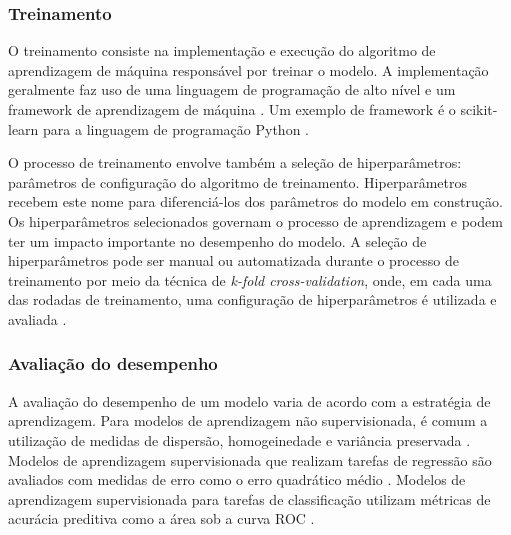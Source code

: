 \subsubsection{Treinamento}

O treinamento consiste na implementação e execução do algoritmo de aprendizagem de máquina responsável por treinar o modelo. A implementação geralmente faz uso de
uma linguagem de programação de alto nível e um framework de aprendizagem de máquina \cite{Greener2021}. Um exemplo de framework é o scikit-learn \cite{ScikitLearn}
para a linguagem de programação Python \cite{Python}.

O processo de treinamento envolve também a seleção de hiperparâmetros: parâmetros de configuração do algoritmo de treinamento. Hiperparâmetros recebem este nome para
diferenciá-los dos parâmetros do modelo em construção. Os hiperparâmetros selecionados governam o processo de aprendizagem e podem ter um impacto importante no desempenho
do modelo. A seleção de hiperparâmetros pode ser manual ou automatizada durante o processo de treinamento por meio da técnica de \textit{k-fold cross-validation}, onde,
em cada uma das rodadas de treinamento, uma configuração de hiperparâmetros é utilizada e avaliada \cite{Delgadillo2020}.

\subsubsection{Avaliação do desempenho}

A avaliação do desempenho de um modelo varia de acordo com a estratégia de aprendizagem. Para modelos de aprendizagem não supervisionada, é comum a utilização de medidas de
dispersão, homogeinedade e variância preservada \cite{Naeem2023}. Modelos de aprendizagem supervisionada que realizam tarefas de regressão são avaliados com medidas de erro
como o erro quadrático médio \cite{Delgadillo2020}. Modelos de aprendizagem supervisionada para tarefas de classificação utilizam métricas de acurácia preditiva como a área
sob a curva ROC \cite{Delgadillo2020}.